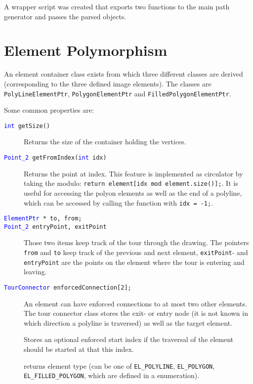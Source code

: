 A wrapper script was created that exports two functions to the main path generator and passes the parsed objects.	

\section{Element Polymorphism}

An element container class exists from which three different classes are derived (corresponding to the three defined image elements). The classes are \texttt{PolyLineElementPtr}, \texttt{PolygonElementPtr} and \texttt{FilledPolygonElementPtr}.

Some common properties are:

\begin{description}

\item[\texttt{\textcolor{blue}{int} getSize()}] Returns the size of the container holding the vertices.

\item[\texttt{\textcolor{blue}{Point\_2} getFromIndex(\textcolor{blue}{int} idx)}] Returns the point at index. This feature is implemented as circulator by taking the modulo: 
\texttt{return element[idx mod element.size()];}. 
It is useful for accessing the polyon elements as well as the end of a polyline, which can be accessed by calling the
function with \texttt{idx = -1;}.

\item[\texttt{\textcolor{blue}{ElementPtr} * to, from;}]
\item[\texttt{\textcolor{blue}{Point\_2} entryPoint, exitPoint}] Those two items keep track of the tour through the drawing. The pointers \texttt{from} and \texttt{to} keep track of the previous and next element, 
\texttt{exitPoint}- and \texttt{entryPoint} are the points on the element where the tour is entering and leaving.

\item[\texttt{\textcolor{blue}{TourConnector} enforcedConnection[2];}] An element can have enforced connections to at most two other elements. The tour connector class stores the exit- or entry node (it is not known in which direction a polyline is traversed) as well as the target element.

\item[] Stores an optional enforced start index if the traversal of the element should be started at that this index.

\item[] returns element type (can be one of \texttt{EL\_POLYLINE}, \texttt{EL\_POLYGON}, \texttt{EL\_FILLED\_POLYGON}, which are defined in a enumeration).



\end{description}

